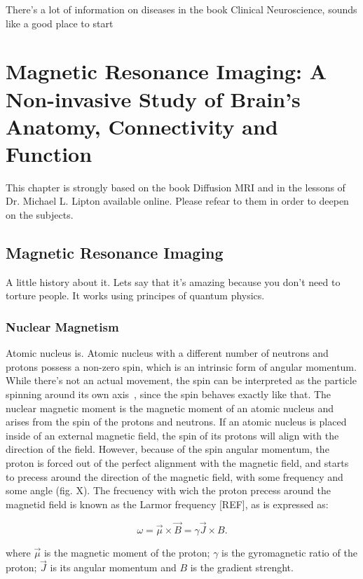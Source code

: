 There's a lot of information on diseases in the book Clinical Neuroscience,
sounds like a good place to start


\chapter{Magnetic Resonance Imaging: A Non-invasive Study of Brain's Anatomy, Connectivity and Function}
\label{ch:bkgrnd}

This chapter is strongly based on the book Diffusion MRI \cite{Basser2009} and in the lessons of Dr. Michael L. Lipton available online\cite{Lipton2014}.
Please refear to them in order to deepen on the subjects.

\section{Magnetic Resonance Imaging}

A little history about it.
Lets say that it's amazing because you don't need to torture people.
It works using principes of quantum physics.

\subsection{Nuclear Magnetism}
Atomic nucleus is.
Atomic nucleus with a different number of neutrons and protons possess a non-zero spin, which is an intrinsic form of angular momentum.
While there's not an actual movement, the spin can be interpreted as the particle spinning around its own axis~\cite{SEGALA1993}, since the spin behaves exactly like that.
The nuclear magnetic moment is the magnetic moment of an atomic nucleus and arises from the spin of the protons and neutrons.
If an atomic nucleus is placed inside of an external magnetic field, the spin of its protons will align with the direction of the field.
However, because of the spin angular momentum, the proton is forced out of the perfect alignment with the magnetic field, and starts to precess around the direction of the magnetic field, with some frequency and some angle (fig. X).
The frecuency with wich the proton precess around the magnetid field is known as the Larmor frequency [REF], as is expressed as:

\begin{equation}
    \label{eq:larmor}
    \omega = \vec{\mu} \times \vec{B} = \gamma \vec{J} \times B.
\end{equation}

where $\vec{\mu}$ is the magnetic moment of the proton;
$\gamma$ is the gyromagnetic ratio of the proton;
$\vec{J}$ is its angular momentum and $B$ is the gradient strenght.

